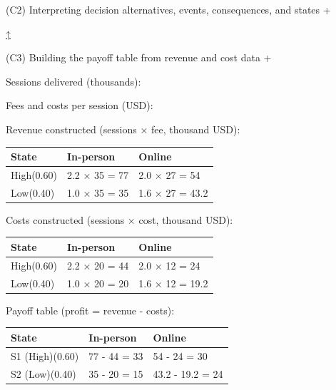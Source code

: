 \documentclass[11pt]{article}
\begin{document}
	
	
	
	
	(C2) Interpreting decision alternatives, events, consequences, and states
	+
	
	
	
	
	
	\hyperref[problem3b-criteria]{↑}
	
	
	
	
	(C3) Building the payoff table from revenue and cost data
	+
	
	
	Sessions delivered (thousands):
	
	Fees and costs per session (USD):
	
	Revenue constructed (sessions × fee, thousand USD):
	\begin{center}
		\begin{tabular}{lll}
			\toprule
			State & In-person & Online \\
			\midrule
			High\newline (0.60) & 2.2 × 35 = 77 & 2.0 × 27 = 54 \\
			Low\newline (0.40) & 1.0 × 35 = 35 & 1.6 × 27 = 43.2 \\
			\bottomrule
		\end{tabular}
	\end{center}
	
	
	Costs constructed (sessions × cost, thousand USD):
	\begin{center}
		\begin{tabular}{lll}
			\toprule
			State & In-person & Online \\
			\midrule
			High\newline (0.60) & 2.2 × 20 = 44 & 2.0 × 12 = 24 \\
			Low\newline (0.40) & 1.0 × 20 = 20 & 1.6 × 12 = 19.2 \\
			\bottomrule
		\end{tabular}
	\end{center}
	
	
	Payoff table (profit = revenue - costs):
	\begin{center}
		\begin{tabular}{lll}
			\toprule
			State & In-person & Online \\
			\midrule
			S1 (High)\newline (0.60) & 77 - 44 = 33 & 54 - 24 = 30 \\
			S2 (Low)\newline (0.40) & 35 - 20 = 15 & 43.2 - 19.2 = 24 \\
			\bottomrule
		\end{tabular}
	\end{center}
	
\end{document}
